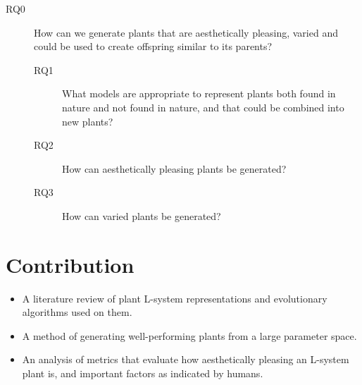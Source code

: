 \begin{description}
    \item[RQ0] How can we generate plants that are aesthetically pleasing, varied and could be used to create offspring similar to its parents?
    \begin{description}
        \item[RQ1] What models are appropriate to represent plants both found in nature and not found in nature, and that could be combined into new plants?
        \item[RQ2] How can aesthetically pleasing plants be generated?
        \item[RQ3] How can varied plants be generated?
    \end{description}
\end{description}

\section{Contribution}
\begin{itemize}
    \item A literature review of plant \gls{L-system} representations and evolutionary algorithms used on them.
    \item A method of generating well-performing plants from a large parameter space.
    \item An analysis of metrics that evaluate how aesthetically pleasing an \gls{L-system} plant is, and important factors as indicated by humans.
\end{itemize}
